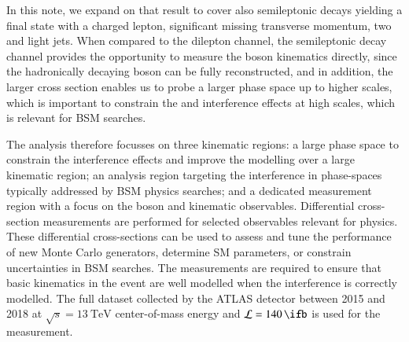 


In this note, we expand on that result to cover also semileptonic \WbWb decays
yielding a final state with a charged lepton, significant missing transverse momentum, two \bjets and light jets.
When compared to the dilepton channel, the semileptonic decay channel provides the opportunity to measure the \Wboson 
boson kinematics directly, since the hadronically decaying \Wboson boson can be fully reconstructed, and in addition, 
the larger cross section enables us to probe a larger phase space up to higher scales, which is important to constrain 
the \ttbar and \tW interference effects at high scales, which is relevant for BSM searches.

The analysis therefore focusses on three kinematic regions: a large phase space to constrain the interference effects and 
improve the modelling over a large kinematic region; an analysis region targeting the interference in phase-spaces typically 
addressed by BSM physics searches; and a dedicated measurement region with a focus on the \Wboson boson and \bjet kinematic observables. 
Differential cross-section measurements are performed for selected observables relevant for \ttbar physics.
These differential cross-sections can be used to assess and tune the performance
of new Monte Carlo generators, determine SM parameters, or constrain uncertainties in BSM searches.
The measurements are required to ensure that basic kinematics in the event
are well modelled when the interference is correctly modelled.
The full dataset collected by the ATLAS detector between 2015 and 2018
at \( \sqrt{s} = \qty{13}{\TeV} \) center-of-mass energy and
\( \mathcal{L} = \qty{140}{\ifb} \) is used for the measurement.

